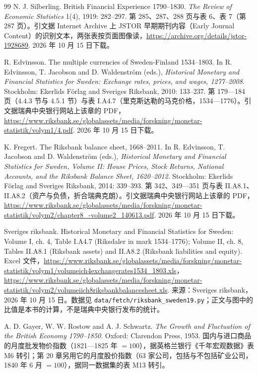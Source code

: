 \begin{thebibliography}{99}
 N. J. Silberling. British Financial Experience 1790--1830. \emph{The Review of Economic Statistics} 1(4), 1919: 282--297. 第 285、287、288 页与表 6、表 7（第 287 页）。引文据 Internet Archive 上 JSTOR 早期期刊内容（Early Journal Content）的识别文本，两张表按页面图像读，\url{https://archive.org/details/jstor-1928689}. 2026 年 10 月 15 日下载。

 R. Edvinsson. The multiple currencies of Sweden-Finland 1534--1803. In R. Edvinsson, T. Jacobson and D. Waldenström (eds.), \emph{Historical Monetary and Financial Statistics for Sweden: Exchange rates, prices, and wages, 1277--2008}. Stockholm: Ekerlids Förlag and Sveriges Riksbank, 2010: 133--237. 第 179—184 页（4.4.3 节与 4.5.1 节）与表 I.A4.7（里克斯达勒的马克价格，1534—1776）。引文据瑞典中央银行网站上该章的 PDF，\url{https://www.riksbank.se/globalassets/media/forskning/monetar-statistik/volym1/4.pdf}. 2026 年 10 月 15 日下载。

 K. Fregert. The Riksbank balance sheet, 1668--2011. In R. Edvinsson, T. Jacobson and D. Waldenström (eds.), \emph{Historical Monetary and Financial Statistics for Sweden, Volume II: House Prices, Stock Returns, National Accounts, and the Riksbank Balance Sheet, 1620--2012}. Stockholm: Ekerlids Förlag and Sveriges Riksbank, 2014: 339--393. 第 342、349—351 页与表 II.A8.1、II.A8.2（资产与负债，折合瑞典克朗）。引文据瑞典中央银行网站上该章的 PDF，\url{https://www.riksbank.se/globalassets/media/forskning/monetar-statistik/volym2/chapter8_-volume2_140613.pdf}. 2026 年 10 月 15 日下载。

 Sveriges riksbank. Historical Monetary and Financial Statistics for Sweden: Volume I, ch. 4, Table I.A4.7 (Riksdaler in mark 1534--1776); Volume II, ch. 8, Tables II.A8.1 (Riksbank assets) and II.A8.2 (Riksbank liabilities and equity). Excel 文件，\url{https://www.riksbank.se/globalassets/media/forskning/monetar-statistik/volym1/volumeich4exchangerates1534_1803.xls}，\url{https://www.riksbank.se/globalassets/media/forskning/monetar-statistik/volym2/volumeiich8riksbankbalancesheet.xls}. 来源：Sveriges riksbank，2026 年 10 月 15 日。数据见 \texttt{data/fetch/riksbank\_sweden19.py}；正文与图中的比值是本书的计算，不是瑞典中央银行发布的统计。

 A. D. Gayer, W. W. Rostow and A. J. Schwartz. \emph{The Growth and Fluctuation of the British Economy 1790--1850}. Oxford: Clarendon Press, 1953. 国内与进口商品的月度批发物价指数（1821—1825 年 $=100$），据英格兰银行《千年宏观数据》表 M6 转引；第 20 章另用它的月度股价指数（63 家公司，包括与不包括矿业公司，1840 年 6 月 $=100$），据同一数据集的表 M13 转引。


\end{thebibliography}
